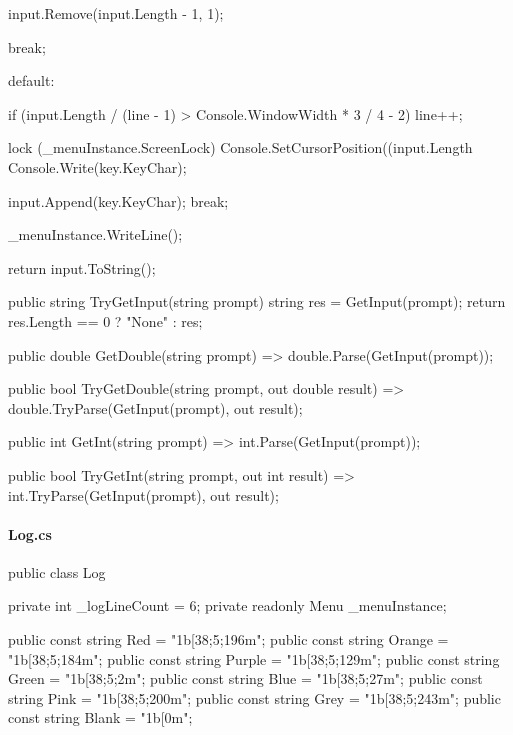 \begin{flushleft}
\begin{cscode}
{{{{{{{                                input.Remove(input.Length - 1, 1);
                            }

                            break;
                        }
                    default:
                        {
                            if (input.Length / (line - 1) > Console.WindowWidth * 3 / 4 - 2) line++;

                            lock (_menuInstance.ScreenLock)
                            {
                                Console.SetCursorPosition((input.Length %
                                Console.Write(key.KeyChar);
                            }

                            input.Append(key.KeyChar);
                            break;
                        }
                }
            }
        }

        _menuInstance.WriteLine();

        return input.ToString();
    }

    public string TryGetInput(string prompt)
    {
        string res = GetInput(prompt);
        return res.Length == 0 ? "None" : res;
    }

    public double GetDouble(string prompt) => double.Parse(GetInput(prompt));

    public bool TryGetDouble(string prompt, out double result) => double.TryParse(GetInput(prompt), out result);

    public int GetInt(string prompt) => int.Parse(GetInput(prompt));

    public bool TryGetInt(string prompt, out int result) => int.TryParse(GetInput(prompt), out result);
}
    \end{cscode}
    
    \paragraph{Log.cs}
    \begin{cscode}
public class Log
{
    private int _logLineCount = 6;
    private readonly Menu _menuInstance;

    public const string Red = "\x1b[38;5;196m";
    public const string Orange = "\x1b[38;5;184m";
    public const string Purple = "\x1b[38;5;129m";
    public const string Green = "\x1b[38;5;2m";
    public const string Blue = "\x1b[38;5;27m";
    public const string Pink = "\x1b[38;5;200m";
    public const string Grey = "\x1b[38;5;243m";
    public const string Blank = "\x1b[0m";

}
\end{cscode}
\end{flushleft}
